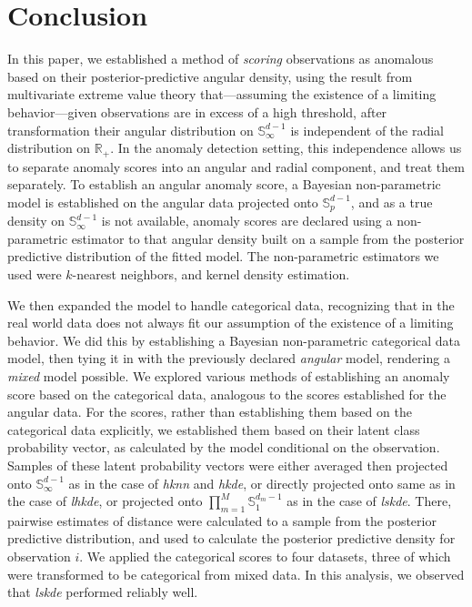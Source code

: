 \section{Conclusion\label{sec:conclusion}}
In this paper, we established a method of \emph{scoring} observations as 
    anomalous based on their posterior-predictive angular density, using the 
    result from multivariate extreme value theory that---assuming the existence 
    of a limiting behavior---given observations are in excess of a high 
    threshold, after transformation their angular distribution on 
    $\mathbb{S}_{\infty}^{d-1}$ is independent of the radial distribution on 
    $\mathbb{R}_+$.  In the anomaly detection setting, this independence allows
    us to separate anomaly scores into an angular and radial component, and
    treat them separately.  To establish an angular anomaly score, a Bayesian 
    non-parametric model is established on the angular data projected onto 
    $\mathbb{S}_p^{d-1}$, and as a true density on $\mathbb{S}_{\infty}^{d-1}$ 
    is not available, anomaly scores are declared using a non-parametric 
    estimator to that angular density built on a sample from the posterior 
    predictive distribution of the fitted model.  The non-parametric estimators 
    we used were $k$-nearest neighbors, and kernel density estimation.

We then expanded the model to handle categorical data, recognizing that in the 
    real world data does not always fit our assumption of the existence of a 
    limiting behavior.  We did this by establishing a Bayesian non-parametric 
    categorical data model, then tying it in with the previously declared 
    \emph{angular} model, rendering a \emph{mixed} model possible.  We explored 
    various methods of establishing an anomaly score based on the categorical 
    data, analogous to the scores established for the angular data.  For the 
    scores, rather than establishing them based on the categorical data 
    explicitly, we established them based on their latent class probability 
    vector, as calculated by the model conditional on the observation. Samples 
    of these latent probability vectors were either averaged then projected onto
    $\mathbb{S}_{\infty}^{d-1}$ as in the case of \emph{hknn} and \emph{hkde}, 
    or directly projected onto same as in the case of \emph{lhkde}, or 
    projected onto $\prod_{m = 1}^M\mathbb{S}_1^{d_{m}-1}$ as in the case 
    of \emph{lskde}.  There, pairwise estimates of distance were calculated to 
    a sample from the posterior predictive distribution, and used to calculate 
    the posterior predictive density for observation $i$. We applied the 
    categorical scores to four datasets, three of which were transformed to be 
    categorical from mixed data.  In this analysis, we observed that 
    \emph{lskde} performed reliably well.

